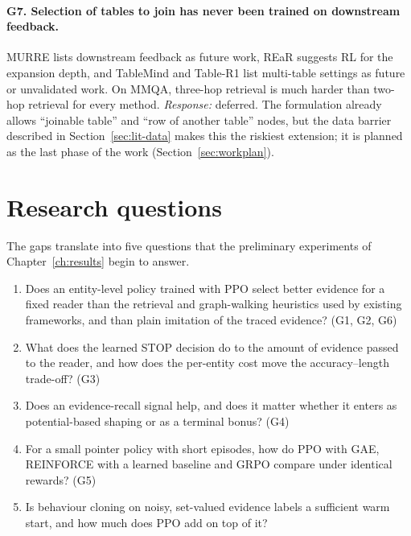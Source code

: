 \paragraph{G7. Selection of tables to join has never been trained on downstream feedback.} MURRE lists downstream feedback as future work, REaR suggests RL for the expansion depth, and TableMind and Table-R1 list multi-table settings as future or unvalidated work. On MMQA, three-hop retrieval is much harder than two-hop retrieval for every method. \emph{Response:} deferred. The formulation already allows ``joinable table'' and ``row of another table'' nodes, but the data barrier described in Section~\ref{sec:lit-data} makes this the riskiest extension; it is planned as the last phase of the work (Section~\ref{sec:workplan}).

\section{Research questions}

The gaps translate into five questions that the preliminary experiments of Chapter~\ref{ch:results} begin to answer.

\begin{enumerate}[label=\textbf{RQ\arabic*.}, leftmargin=*]
  \item Does an entity-level policy trained with PPO select better evidence for a fixed reader than the retrieval and graph-walking heuristics used by existing frameworks, and than plain imitation of the traced evidence? (G1, G2, G6)
  \item What does the learned STOP decision do to the amount of evidence passed to the reader, and how does the per-entity cost move the accuracy--length trade-off? (G3)
  \item Does an evidence-recall signal help, and does it matter whether it enters as potential-based shaping or as a terminal bonus? (G4)
  \item For a small pointer policy with short episodes, how do PPO with GAE, REINFORCE with a learned baseline and GRPO compare under identical rewards? (G5)
  \item Is behaviour cloning on noisy, set-valued evidence labels a sufficient warm start, and how much does PPO add on top of it?
\end{enumerate}
